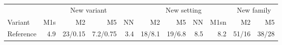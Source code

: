\documentclass[pdflatex,sn-basic,lineno]{sn-jnl}
\providecommand{\DIFaddbeginFL}{} %
\providecommand{\DIFdelendFL}{} %
\newcommand{\DIFaddincludegraphics}[2][]{{\color{blue}\fbox{\DIFOincludegraphics[#1]{#2}}}} %
\DeclareRobustCommand{\DIFaddbeginFL}{\DIFOaddbeginFL \let\includegraphics\DIFaddincludegraphics} %
\DeclareRobustCommand{\DIFdelendFL}{\DIFOaddendFL \let\includegraphics\DIFOincludegraphics} %
\begin{document}
\begin{appendices}
\begin{table}[p]
\DIFdelendFL \DIFaddbeginFL \begin{tabular}{@{}lrrrrrrrrrr@{}}
\toprule
 & \multicolumn{4}{c}{New variant} & \multicolumn{4}{c}{New setting} & \multicolumn{2}{c}{New family} \\
\cmidrule(lr){2-5}\cmidrule(lr){6-9}\cmidrule(lr){10-11}
Variant & M1s & M2 & M5 & NN & M2 & M5 & NN & M1sn & M2 & M5 \\
\midrule
Reference & 4.9 & 23/0.15 & 7.2/0.75 & 3.4 & 18/8.1 & 19/6.8 & 8.5 & 8.2 & 51/16 & 38/28 \\

\end{tabular}
\end{table}
\end{appendices}
\end{document}
